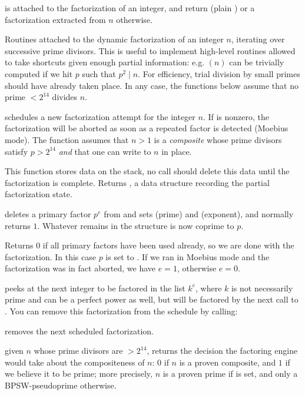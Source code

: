 is attached to the factorization of an integer, and return 
(plain ) or a factorization extracted from $n$ otherwise.


Routines attached to the dynamic factorization of an integer $n$, iterating
over successive prime divisors. This is useful to implement high-level
routines allowed to take shortcuts given enough partial information: e.g.
$(n)$ can be trivially computed if we hit $p$ such that $p^2
\mid n$. For efficiency, trial division by small primes should have already
taken place. In any case, the functions below assume that no prime $< 2^{14}$
divides $n$.

 schedules a new factorization
attempt for the integer $n$. If  is nonzero, the factorization
will be aborted as soon as a repeated factor is detected (Moebius mode).
The function assumes that $n > 1$ is a \emph{composite}  whose prime
divisors satisfy $p > 2^{14}$ \emph{and} that one can write to $n$ in place.

This function stores data on the stack, no  call should
delete this data until the factorization is complete. Returns ,
a data structure recording the partial factorization state.

 deletes a primary factor
$p^e$ from  and sets  (prime) and  (exponent), and
normally returns $1$. Whatever remains in the  structure is now
coprime to $p$.

Returns $0$ if all primary factors have been used already, so we are done
with the factorization. In this case $p$ is set to . If we ran in
Moebius mode and the factorization was in fact aborted, we have $e = 1$,
otherwise $e = 0$.

 peeks at the next integer
to be factored in the list $k^e$, where $k$ is not necessarily prime
and can be a perfect power as well, but will be factored by the next call to
. You can remove this factorization from the schedule by
calling:

 removes the next scheduled factorization.

 given $n$ whose prime divisors are $> 2^{14}$,
returns the decision the factoring engine would take about the compositeness
of $n$: $0$ if $n$ is a proven composite, and $1$ if we believe it to be
prime; more precisely, $n$ is a proven prime if  is
set, and only a BPSW-pseudoprime otherwise.

